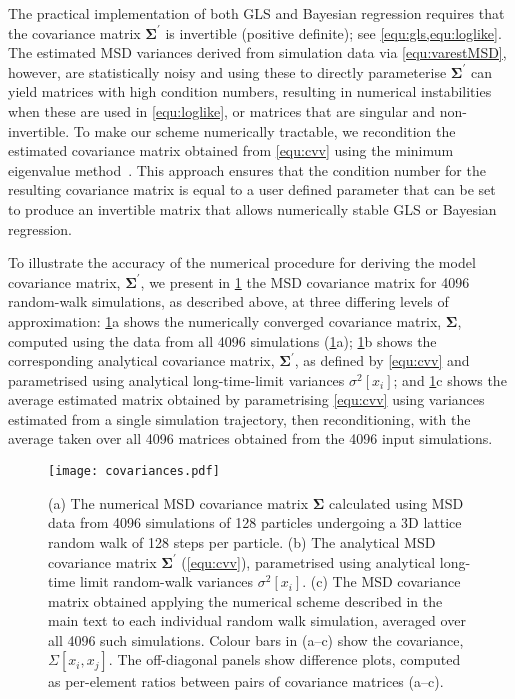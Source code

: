 \documentclass[reprint,superscriptaddress,nobibnotes,amsmath,amssymb,aps,prx,hidelinks]{revtex4-2}
\newcommand{\oMSDi}{\ensuremath{x_i}}
\newcommand{\oMSDj}{\ensuremath{x_j}}
\newcommand{\var}[1]{\ensuremath{\sigma^2[#1]}}
\begin{document}
The practical implementation of both GLS and Bayesian regression requires that the covariance matrix $\mathbf{\Sigma^\prime}$ is invertible (positive definite); see \cref{equ:gls,equ:loglike}.
The estimated MSD variances derived from simulation data via \cref{equ:varestMSD}, however, are statistically noisy and using these to directly parameterise $\mathbf{\Sigma^\prime}$ can yield matrices with high condition numbers, resulting in numerical instabilities when these are used in \cref{equ:loglike}, or matrices that are singular and non-invertible.
To make our scheme numerically tractable, we recondition the estimated covariance matrix obtained from \cref{equ:cvv} using the minimum eigenvalue method~\cite{TabeartEtAl_TellusDynMeteorolOceanogr2020}.
This approach ensures that the condition number for the resulting covariance matrix is equal to a user defined parameter that can be set to produce an invertible matrix that allows numerically stable GLS or Bayesian regression.

To illustrate the accuracy of the numerical procedure for deriving the model covariance matrix, $\bm{\Sigma^\prime}$, we present in \cref{fig:covariances} the MSD covariance matrix for \num{4096} random-walk simulations, as described above, at three differing levels of approximation:
\cref{fig:covariances}a shows the numerically converged covariance matrix, $\bm{\Sigma}$, computed using the data from all \num{4096} simulations (\cref{fig:covariances}a); \cref{fig:covariances}b shows the corresponding analytical covariance matrix, $\mathbf{\Sigma^\prime}$, as defined by \cref{equ:cvv} and parametrised using analytical long-time-limit variances $\var{\oMSDi}$; and \cref{fig:covariances}c shows the average estimated matrix obtained by parametrising \cref{equ:cvv} using variances estimated from a single simulation trajectory, then reconditioning, with the average taken over all \num{4096} matrices obtained from the \num{4096} input simulations. 
\begin{figure}
    \centering
    \texttt{[image: covariances.pdf]}
    \caption{
        (a) The numerical MSD covariance matrix $\bm{\Sigma}$ calculated using MSD data from \num{4096} simulations of \num{128} particles undergoing a 3D lattice random walk of \num{128} steps per particle.
        (b) The analytical MSD covariance matrix $\bm{\Sigma^\prime}$ (\cref{equ:cvv}), parametrised using analytical long-time limit random-walk variances $\var{\oMSDi}$.
        (c) The MSD covariance matrix obtained applying the numerical scheme described in the main text to each individual random walk simulation, averaged over all \num{4096} such simulations.
        Colour bars in (a--c) show the covariance, $\Sigma\left[\oMSDi, \oMSDj\right]$.
        The off-diagonal panels show difference plots, computed as per-element ratios between pairs of covariance matrices (a--c).
    }
    \label{fig:covariances}
\end{figure}
\end{document}
